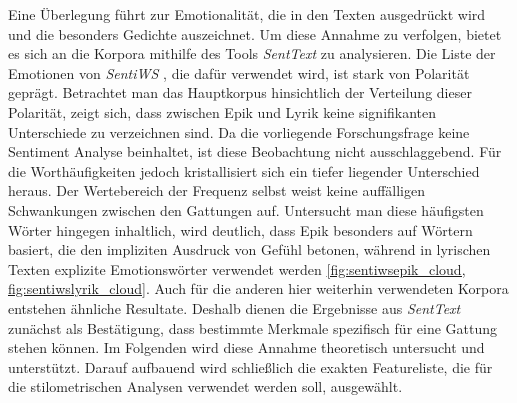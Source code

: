 \documentclass[a4paper,10p]{article}
\begin{document}
Eine Überlegung führt zur Emotionalität, die in den Texten ausgedrückt wird und die besonders Gedichte auszeichnet. Um diese Annahme zu verfolgen, bietet es sich an die Korpora mithilfe des Tools \textit{SentText} zu analysieren. Die Liste der Emotionen von \textit{SentiWS} \citep{Sentiws}, die dafür verwendet wird, ist stark von Polarität geprägt. Betrachtet man das Hauptkorpus hinsichtlich der Verteilung dieser Polarität, zeigt sich, dass zwischen Epik und Lyrik keine signifikanten Unterschiede zu verzeichnen sind. Da die vorliegende Forschungsfrage keine Sentiment Analyse beinhaltet, ist diese Beobachtung nicht ausschlaggebend. Für die Worthäufigkeiten jedoch kristallisiert sich ein tiefer liegender Unterschied heraus. Der Wertebereich der Frequenz selbst weist keine auffälligen Schwankungen zwischen den Gattungen auf. Untersucht man diese häufigsten Wörter hingegen inhaltlich, wird deutlich, dass Epik besonders auf Wörtern basiert, die den impliziten Ausdruck von Gefühl betonen, während in lyrischen Texten explizite Emotionswörter verwendet werden \ref{fig:sentiwsepik_cloud, fig:sentiwslyrik_cloud}. Auch für die anderen hier weiterhin verwendeten Korpora entstehen ähnliche Resultate. Deshalb dienen die Ergebnisse aus \textit{SentText} zunächst als Bestätigung, dass bestimmte Merkmale spezifisch für eine Gattung stehen können. Im Folgenden wird diese Annahme theoretisch untersucht und unterstützt. Darauf aufbauend wird schließlich die exakten Featureliste, die für die stilometrischen Analysen verwendet werden soll, ausgewählt.\par 
\end{document}
